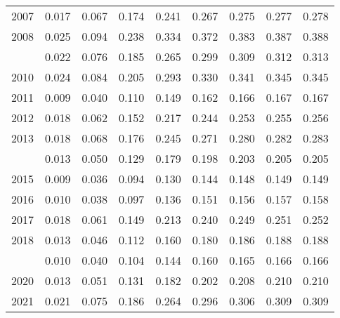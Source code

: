 \documentclass[
]{article}
\begin{document}
\begin{longtable}[t]{lrrrrrrrr}
2007 & 0.017 & 0.067 & 0.174 & 0.241 & 0.267 & 0.275 & 0.277 & 0.278\\
2008 & 0.025 & 0.094 & 0.238 & 0.334 & 0.372 & 0.383 & 0.387 & 0.388\\
\addlinespace
2009 & 0.022 & 0.076 & 0.185 & 0.265 & 0.299 & 0.309 & 0.312 & 0.313\\
2010 & 0.024 & 0.084 & 0.205 & 0.293 & 0.330 & 0.341 & 0.345 & 0.345\\
2011 & 0.009 & 0.040 & 0.110 & 0.149 & 0.162 & 0.166 & 0.167 & 0.167\\
2012 & 0.018 & 0.062 & 0.152 & 0.217 & 0.244 & 0.253 & 0.255 & 0.256\\
2013 & 0.018 & 0.068 & 0.176 & 0.245 & 0.271 & 0.280 & 0.282 & 0.283\\
\addlinespace
2014 & 0.013 & 0.050 & 0.129 & 0.179 & 0.198 & 0.203 & 0.205 & 0.205\\
2015 & 0.009 & 0.036 & 0.094 & 0.130 & 0.144 & 0.148 & 0.149 & 0.149\\
2016 & 0.010 & 0.038 & 0.097 & 0.136 & 0.151 & 0.156 & 0.157 & 0.158\\
2017 & 0.018 & 0.061 & 0.149 & 0.213 & 0.240 & 0.249 & 0.251 & 0.252\\
2018 & 0.013 & 0.046 & 0.112 & 0.160 & 0.180 & 0.186 & 0.188 & 0.188\\
\addlinespace
2019 & 0.010 & 0.040 & 0.104 & 0.144 & 0.160 & 0.165 & 0.166 & 0.166\\
2020 & 0.013 & 0.051 & 0.131 & 0.182 & 0.202 & 0.208 & 0.210 & 0.210\\
2021 & 0.021 & 0.075 & 0.186 & 0.264 & 0.296 & 0.306 & 0.309 & 0.309\\*
\end{longtable}
\end{document}
